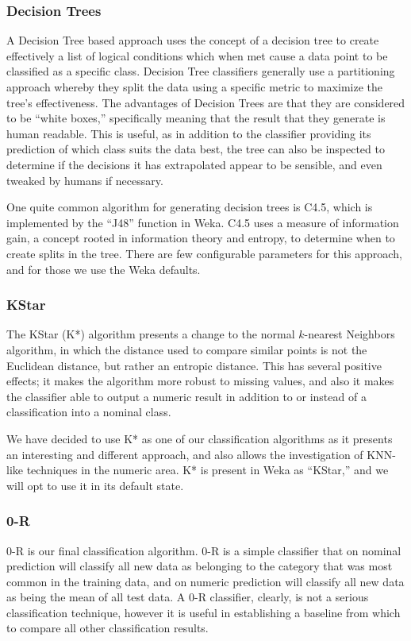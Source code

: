 \documentclass[../thesis/thesis.tex]{subfiles}
\begin{document}
\subsubsection{Decision Trees}
A Decision Tree based approach uses the concept of a decision tree to create effectively a list of logical conditions which when met cause a data point to be classified as a specific class. Decision Tree classifiers generally use a partitioning approach whereby they split the data using a specific metric to maximize the tree's effectiveness. The advantages of Decision Trees are that they are considered to be ``white boxes,'' specifically meaning that the result that they generate is human readable. This is useful, as in addition to the classifier providing its prediction of which class suits the data best, the tree can also be inspected to determine if the decisions it has extrapolated appear to be sensible, and even tweaked by humans if necessary.

One quite common algorithm for generating decision trees is C4.5, which is implemented by the ``J48'' function in Weka. C4.5 uses a measure of information gain, a concept rooted in information theory and entropy, to determine when to create splits in the tree. There are few configurable parameters for this approach, and for those we use the Weka defaults.

\subsubsection{KStar}
The KStar (K*) algorithm presents a change to the normal $k$-nearest Neighbors algorithm, in which the distance used to compare similar points is not the Euclidean distance, but rather an entropic distance. This has several positive effects; it makes the algorithm more robust to missing values, and also it makes the classifier able to output a numeric result in addition to or instead of a classification into a nominal class.

We have decided to use K* as one of our classification algorithms as it presents an interesting and different approach, and also allows the investigation of KNN-like techniques in the numeric area. K* is present in Weka as ``KStar,'' and we will opt to use it in its default state.

\subsubsection{0-R}
0-R is our final classification algorithm. 0-R is a simple classifier that on nominal prediction will classify all new data as belonging to the category that was most common in the training data, and on numeric prediction will classify all new data as being the mean of all test data. A 0-R classifier, clearly, is not a serious classification technique, however it is useful in establishing a baseline from which to compare all other classification results.
\end{document}
